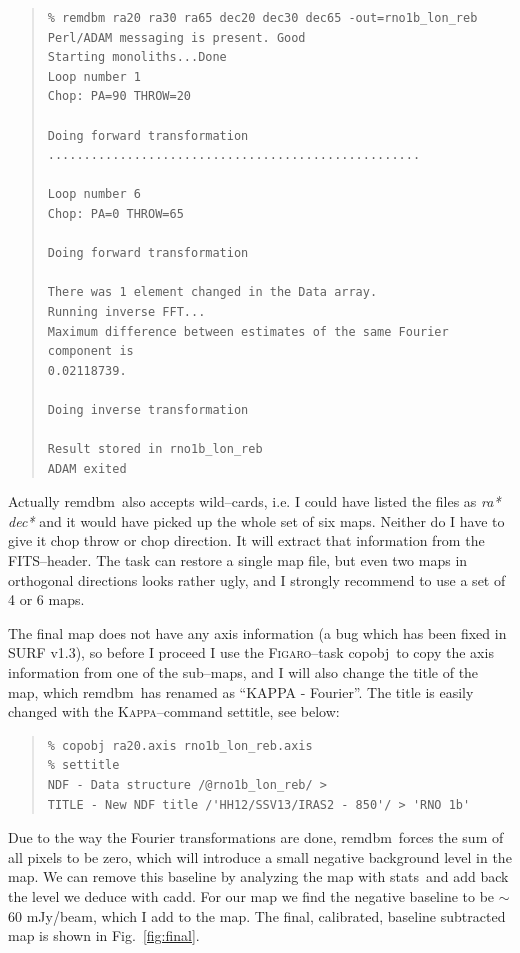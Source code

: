 \documentclass[twoside,11pt]{article}
\newenvironment{myquote}{\begin{quote}\begin{small}}{\end{small}\end{quote}}
\newcommand{\Kappa}{\xref{\textsc{Kappa}}{sun95}{}}
\newcommand{\Figaro}{\xref{\textsc{Figaro}}{sun86}{}}
\newcommand{\task}[1]{\textsf{#1}}
\newcommand{\remdbm}{\xref{\task{remdbm}}{sun216}{REMDBM}}
\newcommand{\stats}{\xref{\task{stats}}{sun95}{STATS}}
\newcommand{\cadd}{\xref{\task{cadd}}{sun95}{CADD}}
\newcommand{\settitle}{\xref{\task{settitle}}{sun95}{SETTITLE}}
\newcommand{\copobj}{\xref{\task{copobj}}{sun86}{COPOBJ}}
\newcommand{\xref}[3]{#1}
\renewcommand{\_}{\texttt{\symbol{95}}}
\begin{document}
\begin{myquote}
\begin{verbatim}
% remdbm ra20 ra30 ra65 dec20 dec30 dec65 -out=rno1b_lon_reb
Perl/ADAM messaging is present. Good
Starting monoliths...Done
Loop number 1
Chop: PA=90 THROW=20

Doing forward transformation
....................................................

Loop number 6
Chop: PA=0 THROW=65

Doing forward transformation

There was 1 element changed in the Data array.
Running inverse FFT...
Maximum difference between estimates of the same Fourier component is
0.02118739.

Doing inverse transformation

Result stored in rno1b_lon_reb
ADAM exited

\end{verbatim}
\end{myquote}

Actually \remdbm\ also accepts wild--cards, i.e. I could have listed
the files as {\it ra* dec*} and it would have picked up the whole set
of six maps. Neither do I have to give it chop throw or chop direction.
It will extract that information from the FITS--header. The task can
restore a single map file, but even two maps in orthogonal directions
looks rather ugly, and I strongly recommend to use a set of 4 or 6
maps.

The final map does not have any axis information (a bug which has been fixed
in SURF v1.3), so before I proceed I use
the \Figaro--task \copobj\ to copy the axis information from one of the
sub--maps, and I will also change the title of the map, which
\remdbm\ has renamed as ``KAPPA - Fourier''. The title is easily
changed with the \Kappa--command \settitle, see below:


\begin{myquote}
\begin{verbatim}
% copobj ra20.axis rno1b_lon_reb.axis
% settitle
NDF - Data structure /@rno1b_lon_reb/ > 
TITLE - New NDF title /'HH12/SSV13/IRAS2 - 850'/ > 'RNO 1b'
\end{verbatim}
\end{myquote}

Due to the way the Fourier transformations are done, \remdbm\ forces
the sum of all pixels to be zero, which will introduce a small negative
background level in the map. We can remove this baseline by analyzing
the map with \stats\ and add back the level we deduce with
\cadd. For our map we find the negative baseline to be $\sim$ 60
mJy/beam, which I add to the map. The final, calibrated, baseline
subtracted map is shown in Fig.\ \ref{fig:final}.
\end{document}

